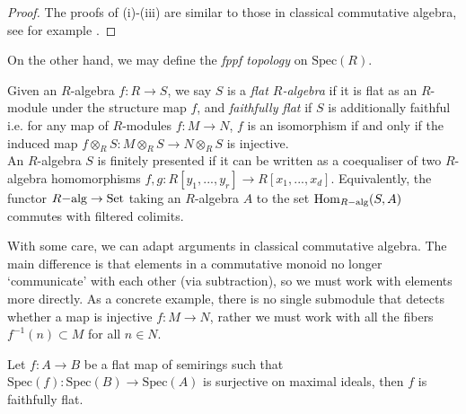 \begin{proof}
The proofs of (i)-(iii) are similar to those in classical commutative algebra, see for example \cite[Tag 00DY]{sp}.
\end{proof}
On the other hand, we may define the \textit{fppf topology} on $\text{Spec}(R)$. 
\begin{definition}
Given an $R$-algebra $f:R \to S$, we say $S$ is a \textit{flat $R$-algebra} 
if it is flat as an $R$-module under the structure map $f$, and \textit{faithfully flat} if $S$ is additionally faithful i.e. 
for any map of $R$-modules $f: M \to N$, $f$ is an isomorphism if and only if the induced map 
$f \otimes_R S: M \otimes_R S \to N \otimes_R S$ is injective.\\
\indent An $R$-algebra $S$ is finitely presented if it can be written as a coequaliser of two $R$-algebra homomorphisms 
$f,g: R[y_1,...,y_r] \to R[x_1,...,x_d]$. Equivalently, the functor ${R}\mathrm{-alg} \rightarrow \text{Set}$ taking an $R$-algebra $A$ to the set 
$\operatorname{Hom}_{{R}\mathrm{-alg}}(S, A)$ commutes with filtered colimits.
\end{definition}
With some care, we can adapt arguments in classical commutative algebra. The main difference is that elements in a commutative monoid
no longer `communicate' with each other (via subtraction), so we must work with elements more directly. As a concrete example,
there is no single submodule that detects whether a map is injective $f: M \to N$, rather we must work with all the fibers $f^{-1}(n) \subset M$
for all $n \in N$.
\begin{proposition}\label{prop:flatsurjmax}
Let $f: A \to B$ be a flat map of semirings such that $\text{Spec}(f):\text{Spec}(B) \to \text{Spec}(A)$ is surjective on maximal ideals, then $f$ is faithfully flat.
\end{proposition}
